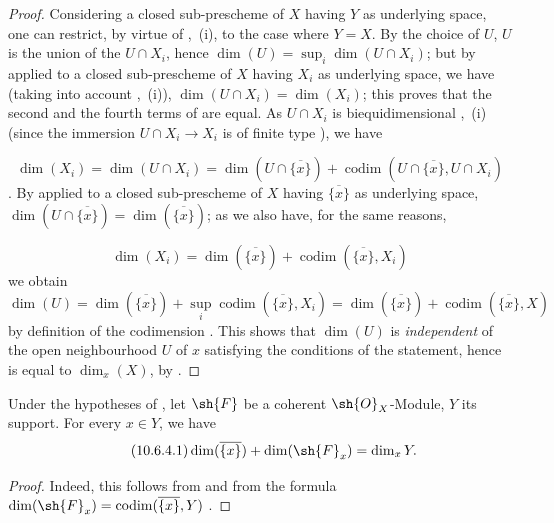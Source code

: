\begin{proof}
Considering a closed sub-prescheme of $X$ having $Y$ as underlying space, one can restrict, by virtue of ,~(i), to the case where $Y=X$.
By the choice of $U$, $U$ is the union of the $U\cap X_i$, hence $\dim(U)=\sup_i\dim(U\cap X_i)$; but by  applied to a closed sub-prescheme of $X$ having $X_i$ as underlying space, we have (taking into account ,~(i)), $\dim(U\cap X_i)=\dim(X_i)$; this proves that the second and the fourth terms of  are equal.
As $U\cap X_i$ is biequidimensional ,~(i) (since the immersion $U\cap X_i\to X_i$ is of finite type ), we have

\begin{equation}
\label{IV.10.6.3.2}
\tag{10.6.3.2}
\dim(X_i)=\dim(U\cap X_i)=\dim(U\cap\overline{\{x\}})+\operatorname{codim}(U\cap\overline{\{x\}},U\cap X_i)
\end{equation}
.
By  applied to a closed sub-prescheme of $X$ having $\overline{\{x\}}$ as underlying space, $\dim(U\cap\overline{\{x\}})=\dim(\overline{\{x\}})$; as we also have, for the same reasons,

\begin{equation}
\label{IV.10.6.3.3}
\tag{10.6.3.3}
\dim(X_i)=\dim(\overline{\{x\}})+\operatorname{codim}(\overline{\{x\}},X_i)
\end{equation}
we obtain
\[
  \dim(U)=\dim(\overline{\{x\}})+\sup_i\operatorname{codim}(\overline{\{x\}},X_i)=\dim(\overline{\{x\}})+\operatorname{codim}(\overline{\{x\}},X)
\]
by definition of the codimension .
This shows that $\dim(U)$ is \emph{independent} of the open neighbourhood $U$ of $x$ satisfying the conditions of the statement, hence is equal to $\dim_x(X)$, by .
\end{proof}

\begin{corollary}[10.6.4]
\label{IV.10.6.4}
Under the hypotheses of , let $\sh{F}$ be a coherent $\sh{O}_X$-Module, $Y$ its support.
For every $x\in Y$, we have
\begin{equation}
\label{IV.10.6.4.1}
\tag{10.6.4.1}
\dim(\overline{\{x\}})+\dim(\sh{F}_x)=\dim_x Y.
\end{equation}
\end{corollary}

\begin{proof}
Indeed, this follows from  and from the formula $\dim(\sh{F}_x)=\operatorname{codim}(\overline{\{x\}},Y)$ .
\end{proof}

